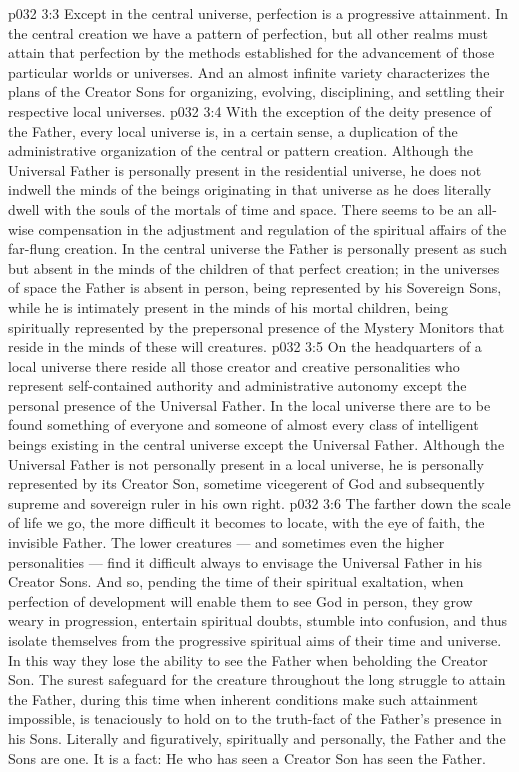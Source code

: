 \vs p032 3:3 Except in the central universe, perfection is a progressive attainment. In the central creation we have a pattern of perfection, but all other realms must attain that perfection by the methods established for the advancement of those particular worlds or universes. And an almost infinite variety characterizes the plans of the Creator Sons for organizing, evolving, disciplining, and settling their respective local universes.
\vs p032 3:4 \pc With the exception of the deity presence of the Father, every local universe is, in a certain sense, a duplication of the administrative organization of the central or pattern creation. Although the Universal Father is personally present in the residential universe, he does not indwell the minds of the beings originating in that universe as he does literally dwell with the souls of the mortals of time and space. There seems to be an all\hyp{}wise compensation in the adjustment and regulation of the spiritual affairs of the far\hyp{}flung creation. In the central universe the Father is personally present as such but absent in the minds of the children of that perfect creation; in the universes of space the Father is absent in person, being represented by his Sovereign Sons, while he is intimately present in the minds of his mortal children, being spiritually represented by the prepersonal presence of the Mystery Monitors that reside in the minds of these will creatures.
\vs p032 3:5 On the headquarters of a local universe there reside all those creator and creative personalities who represent self\hyp{}contained authority and administrative autonomy except the personal presence of the Universal Father. In the local universe there are to be found something of everyone and someone of almost every class of intelligent beings existing in the central universe except the Universal Father. Although the Universal Father is not personally present in a local universe, he is personally represented by its Creator Son, sometime vicegerent of God and subsequently supreme and sovereign ruler in his own right.
\vs p032 3:6 The farther down the scale of life we go, the more difficult it becomes to locate, with the eye of faith, the invisible Father. The lower creatures --- and sometimes even the higher personalities --- find it difficult always to envisage the Universal Father in his Creator Sons. And so, pending the time of their spiritual exaltation, when perfection of development will enable them to see God in person, they grow weary in progression, entertain spiritual doubts, stumble into confusion, and thus isolate themselves from the progressive spiritual aims of their time and universe. In this way they lose the ability to see the Father when beholding the Creator Son. The surest safeguard for the creature throughout the long struggle to attain the Father, during this time when inherent conditions make such attainment impossible, is tenaciously to hold on to the truth\hyp{}fact of the Father’s presence in his Sons. Literally and figuratively, spiritually and personally, the Father and the Sons are one. It is a fact: He who has seen a Creator Son has seen the Father.
